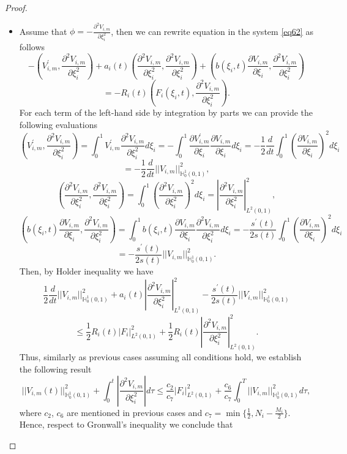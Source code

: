 \documentclass[preprint,12pt,authoryear]{elsarticle}
\begin{document}
\begin{proof}
\begin{itemize}
        \item[Case 3.] Assume that $\phi=-\frac{\partial^2 V_{i,m}}{\partial\xi_i^2}$, then we can rewrite equation in the system \eqref{eq62} as follows
        $$-\left(V_{i,m}^{\prime},\frac{\partial^2 V_{i,m}}{\partial\xi_i^2}\right)+a_i(t)\left(\frac{\partial^2 V_{i,m}}{\partial \xi_i^2},\frac{\partial^2 V_{i,m}}{\partial\xi_i^2}\right)+\left(b(\xi_i,t)\frac{\partial V_{i,m}}{\partial \xi_i},\frac{\partial^2 V_{i,m}}{\partial\xi_i^2}\right)$$
        $$=-R_i(t)\left(F_i(\xi_i,t),\frac{\partial^2 V_{i,m}}{\partial\xi_i^2}\right).$$
        For each term of the left-hand side by integration by parts we can provide the following evaluations
        $$\left(V_{i,m}^{\prime},\frac{\partial^2 V_{i,m}}{\partial\xi_i^2}\right)=\int_0^1 V_{i,m}^{\prime}\frac{\partial^2 V_{i,m}}{\partial\xi_i^2}d\xi_i=-\int_0^1\frac{\partial V_{i,m}^{\prime}}{\partial\xi_i}\frac{\partial V_{i,m}}{\partial\xi_i}d\xi_i=-\frac{1}{2}\frac{d}{dt}\int_0^1\left(\frac{\partial V_{i,m}}{\partial\xi_i}\right)^2d\xi_i$$
        $$=-\frac{1}{2}\frac{d}{dt}||V_{i,m}||_{\mathbb{H}_0^1(0,1)}^2,$$
        $$\left(\frac{\partial^2 V_{i,m}}{\partial \xi_i^2},\frac{\partial^2 V_{i,m}}{\partial\xi_i^2}\right)=\int_0^1\left(\frac{\partial^2V_{i,m}}{\partial\xi_i^2}\right)^2d\xi_i=\left|\frac{\partial^2V_{i,m}}{\partial\xi_i^2}\right|_{L^2(0,1)}^2,$$
        $$\left(b(\xi_i,t)\frac{\partial V_{i,m}}{\partial \xi_i},\frac{\partial^2 V_{i,m}}{\partial\xi_i^2}\right)=\int_0^1 b(\xi_i,t)\frac{\partial V_{i,m}}{\partial\xi_i}\frac{\partial^2 V_{i,m}}{\partial\xi_i^2}d\xi_i=-\frac{s^{\prime}(t)}{2s(t)}\int_0^1\left(\frac{\partial V_{i,m}}{\partial\xi_i}\right)^2d\xi_i$$
        $$=-\frac{s^{\prime}(t)}{2s(t)}||V_{i,m}||_{\mathbb{H}_0^1(0,1)}^2.$$
        Then, by Holder inequality we have
        $$\frac{1}{2}\frac{d}{dt}||V_{i,m}||_{\mathbb{H}_0^1(0,1)}^2+a_i(t)\left|\frac{\partial^2V_{i,m}}{\partial\xi_i^2}\right|_{L^2(0,1)}^2-\frac{s^{\prime}(t)}{2s(t)}||V_{i,m}||_{\mathbb{H}_0^1(0,1)}^2$$
        $$\leq\frac{1}{2}R_i(t)|F_i|_{L^2(0,1)}^2+\frac{1}{2}R_i(t)\left|\frac{\partial^2V_{i,m}}{\partial\xi_i^2}\right|_{L^2(0,1)}^2.$$
        Thus, similarly as previous cases assuming all conditions hold, we establish the following result
        $$||V_{i,m}(t)||_{\mathbb{H}_0^1(0,1)}^2+\int_0^t\left|\frac{\partial^2V_{i,m}}{\partial\xi_i^2}\right|d\tau\leq \frac{c_2}{c_7}|F_i|_{L^2(0,1)}^2+\frac{c_6}{c_7}\int_0^T||V_{i,m}||_{\mathbb{H}_0^1(0,1)}^2d\tau,$$
        where $c_2$, $c_6$ are mentioned in previous cases and $c_7=\min\{\frac{1}{2},N_i-\frac{M_i}{2}\}$. Hence, respect to Gronwall's inequality we conclude that

\end{itemize}
\end{proof}
\end{document}
